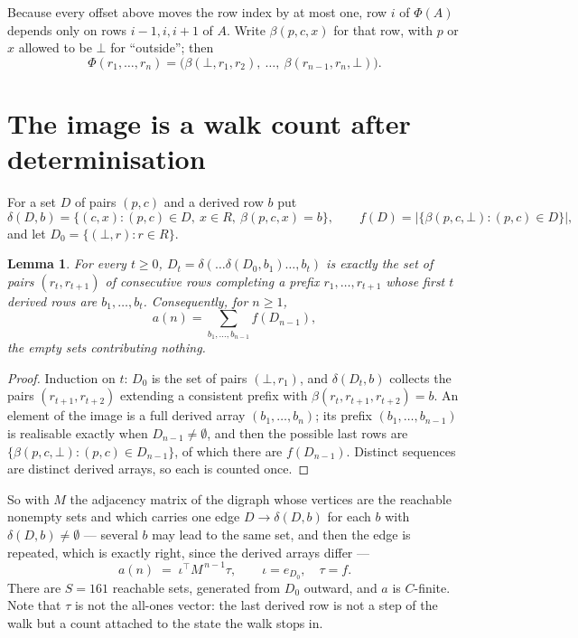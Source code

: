 \documentclass[11pt,a4paper]{article}
\theoremstyle{plain}
\newtheorem{lemma}[theorem]{Lemma}
\theoremstyle{definition}
\begin{document}
Because every offset above moves the row index by at most one, row $i$ of
$\Phi(A)$ depends only on rows $i-1,i,i+1$ of $A$. Write $\beta(p,c,x)$ for that row, with $p$
or $x$ allowed to be $\bot$ for ``outside''; then
\[
\Phi(r_1,\dots,r_n)=\bigl(\beta(\bot,r_1,r_2),\ \dots,\ \beta(r_{n-1},r_n,\bot)\bigr).
\]

\section{The image is a walk count after determinisation}

For a set $D$ of pairs $(p,c)$ and a derived row $b$ put
\[
\delta(D,b)=\{(c,x):(p,c)\in D,\ x\in R,\ \beta(p,c,x)=b\},\qquad
f(D)=\bigl|\{\beta(p,c,\bot):(p,c)\in D\}\bigr| ,
\]
and let $D_0=\{(\bot,r):r\in R\}$.

\begin{lemma}\label{lem:det}
For every $t\ge0$, $D_t=\delta(\dots\delta(D_0,b_1)\dots,b_t)$ is exactly the set of pairs
$(r_t,r_{t+1})$ of consecutive rows completing a prefix $r_1,\dots,r_{t+1}$ whose first $t$
derived rows are $b_1,\dots,b_t$. Consequently, for $n\ge1$,
\[
a(n)=\sum_{b_1,\dots,b_{n-1}}f(D_{n-1}),
\]
the empty sets contributing nothing.
\end{lemma}

\begin{proof}
Induction on $t$: $D_0$ is the set of pairs $(\bot,r_1)$, and $\delta(D_t,b)$ collects the
pairs $(r_{t+1},r_{t+2})$ extending a consistent prefix with
$\beta(r_t,r_{t+1},r_{t+2})=b$. An element of the image is a full derived array
$(b_1,\dots,b_n)$; its prefix $(b_1,\dots,b_{n-1})$ is realisable exactly when
$D_{n-1}\neq\emptyset$, and then the possible last rows are
$\{\beta(p,c,\bot):(p,c)\in D_{n-1}\}$, of which there are $f(D_{n-1})$. Distinct sequences
are distinct derived arrays, so each is counted once.
\end{proof}

So with $M$ the adjacency matrix of the digraph whose vertices are the reachable nonempty sets
and which carries one edge $D\to\delta(D,b)$ for each $b$ with $\delta(D,b)\neq\emptyset$ ---
several $b$ may lead to the same set, and then the edge is repeated, which is exactly right,
since the derived arrays differ ---
\[
a(n)\;=\;\iota^{\!\top}M^{\,n-1}\tau,\qquad \iota=e_{D_0},\quad \tau=f .
\]
There are $S=161$ reachable sets, generated from $D_0$ outward, and $a$ is $C$-finite.
Note that $\tau$ is not the all-ones vector: the last derived row is not a
step of the walk but a count attached to the state the walk stops in.
\end{document}
